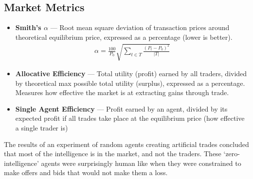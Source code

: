 \documentclass[11pt,a4paper,titlepage,dvipsnames,cmyk]{scrartcl}
\begin{document}
\subsection{Market Metrics}
\begin{itemize}
    \item \textbf{Smith's $\alpha$} --- Root mean square deviation of transaction prices around theoretical equilibrium price, expressed as a percentage (lower is better).
    \begin{align*}
    \alpha = \frac{100}{P_0} \sqrt{\sum_{t \in T} \frac{(P_t - P_0)^2}{|T|}}
    \end{align*}
    \item \textbf{Allocative Efficiency} --- Total utility (profit) earned by all traders, divided by theoretical max possible total utility (surplus), expressed as a percentage. Measures how effective the market is at extracting gains through trade.
    \item \textbf{Single Agent Efficiency} --- Profit earned by an agent, divided by its expected profit if all trades take place at the equilibrium price (how effective a single trader is)
\end{itemize}

The results of an experiment of random agents creating artificial trades concluded that most of the intelligence is in the market, and not the traders. These `zero-intelligence' agents were surprisingly human like when they were constrained to make offers and bids that would not make them a loss.
\end{document}

